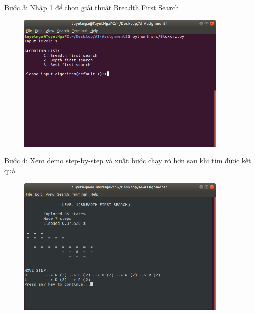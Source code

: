 \documentclass[a4paper]{article}
\begin{document}
\newpage
\begin{flushleft}
	\hspace{3 cm} Bước 3: Nhập 1 để chọn giải thuật Breadth First Search
\end{flushleft}
\begin{center}
	\begin{figure}[htp]
		\begin{center}
			\includegraphics[width=10cm]{Images/breadth1.png}
		\end{center}
		\caption{\label{fig:breadth1}}
	\end{figure}
\end{center}
\begin{flushleft}
	\hspace{2 cm}	Bước 4: Xem demo step-by-step và xuất bước chạy rõ hơn sau khi tìm được kết quả
\end{flushleft}
\begin{center}
	\begin{figure}[htp]
		\begin{center}
			\includegraphics[width=10cm]{Images/breadth3.png}
		\end{center}
		\caption{\label{fig:breadth3}}
	\end{figure}
\end{center}
\newpage
\end{document}
